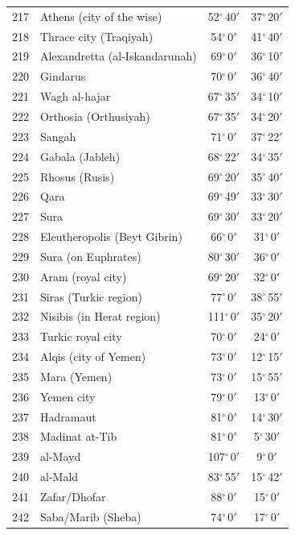 \documentclass[10pt,a4paper]{article}
\begin{document}
\begin{longtable}{r >{\raggedright\arraybackslash}p{8.5cm} c c}
217 & Athens (city of the wise) & 52$^\circ$\,40$'$ & 37$^\circ$\,20$'$\\
218 & Thrace city (Traqiyah) & 54$^\circ$\,0$'$ & 41$^\circ$\,40$'$\\
219 & Alexandretta (al-Iskandarunah) & 69$^\circ$\,0$'$ & 36$^\circ$\,10$'$\\
220 & Gindarus & 70$^\circ$\,0$'$ & 36$^\circ$\,40$'$\\
221 & Wagh al-hajar & 67$^\circ$\,35$'$ & 34$^\circ$\,10$'$\\
222 & Orthosia (Orthusiyah) & 67$^\circ$\,35$'$ & 34$^\circ$\,20$'$\\
223 & Sangah & 71$^\circ$\,0$'$ & 37$^\circ$\,22$'$\\
224 & Gabala (Jableh) & 68$^\circ$\,22$'$ & 34$^\circ$\,35$'$\\
225 & Rhosus (Rusis) & 69$^\circ$\,20$'$ & 35$^\circ$\,40$'$\\
226 & Qara & 69$^\circ$\,49$'$ & 33$^\circ$\,30$'$\\
227 & Sura & 69$^\circ$\,30$'$ & 33$^\circ$\,20$'$\\
228 & Eleutheropolis (Beyt Gibrin) & 66$^\circ$\,0$'$ & 31$^\circ$\,0$'$\\
229 & Sura (on Euphrates) & 80$^\circ$\,30$'$ & 36$^\circ$\,0$'$\\
230 & Aram (royal city) & 69$^\circ$\,20$'$ & 32$^\circ$\,0$'$\\
231 & Siras (Turkic region) & 77$^\circ$\,0$'$ & 38$^\circ$\,55$'$\\
232 & Nisibis (in Herat region) & 111$^\circ$\,0$'$ & 35$^\circ$\,20$'$\\
233 & Turkic royal city & 70$^\circ$\,0$'$ & 24$^\circ$\,0$'$\\
234 & Alqis (city of Yemen) & 73$^\circ$\,0$'$ & 12$^\circ$\,15$'$\\
235 & Mara (Yemen) & 73$^\circ$\,0$'$ & 15$^\circ$\,55$'$\\
236 & Yemen city & 79$^\circ$\,0$'$ & 13$^\circ$\,0$'$\\
237 & Hadramaut & 81$^\circ$\,0$'$ & 14$^\circ$\,30$'$\\
238 & Madinat at-Tib & 81$^\circ$\,0$'$ & 5$^\circ$\,30$'$\\
239 & al-Mayd & 107$^\circ$\,0$'$ & 9$^\circ$\,0$'$\\
240 & al-Mald & 83$^\circ$\,55$'$ & 15$^\circ$\,42$'$\\
241 & Zafar/Dhofar & 88$^\circ$\,0$'$ & 15$^\circ$\,0$'$\\
242 & Saba/Marib (Sheba) & 74$^\circ$\,0$'$ & 17$^\circ$\,0$'$\\

\end{longtable}
\end{document}

